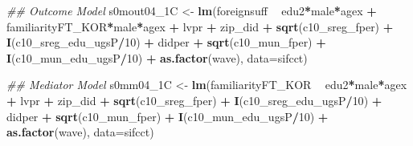 \documentclass[
]{article}
\newenvironment{Shaded}{\begin{snugshade}}{\end{snugshade}}
\newcommand{\CommentTok}[1]{\textcolor[rgb]{0.56,0.35,0.01}{\textit{#1}}}
\newcommand{\DataTypeTok}[1]{\textcolor[rgb]{0.13,0.29,0.53}{#1}}
\newcommand{\DecValTok}[1]{\textcolor[rgb]{0.00,0.00,0.81}{#1}}
\newcommand{\KeywordTok}[1]{\textcolor[rgb]{0.13,0.29,0.53}{\textbf{#1}}}
\newcommand{\NormalTok}[1]{#1}
\newcommand{\OperatorTok}[1]{\textcolor[rgb]{0.81,0.36,0.00}{\textbf{#1}}}
\newcommand{\StringTok}[1]{\textcolor[rgb]{0.31,0.60,0.02}{#1}}
\begin{document}
\begin{Shaded}
\begin{Highlighting}[]
\CommentTok{## Outcome Model }
\NormalTok{s0mout04_1C <-}\StringTok{ }\KeywordTok{lm}\NormalTok{(foreignsuff  }\OperatorTok{~}\StringTok{ }\NormalTok{edu2}\OperatorTok{*}\NormalTok{male}\OperatorTok{*}\NormalTok{agex }\OperatorTok{+}\StringTok{ }\NormalTok{familiarityFT_KOR}\OperatorTok{*}\NormalTok{male}\OperatorTok{*}\NormalTok{agex }\OperatorTok{+}\StringTok{ }\NormalTok{lvpr }\OperatorTok{+}\StringTok{  }
\StringTok{                    }\NormalTok{zip_did }\OperatorTok{+}\StringTok{ }\KeywordTok{sqrt}\NormalTok{(c10_sreg_fper) }\OperatorTok{+}\StringTok{ }\KeywordTok{I}\NormalTok{(c10_sreg_edu_ugsP}\OperatorTok{/}\DecValTok{10}\NormalTok{) }\OperatorTok{+}\StringTok{ }
\StringTok{                    }\NormalTok{didper }\OperatorTok{+}\StringTok{ }\KeywordTok{sqrt}\NormalTok{(c10_mun_fper) }\OperatorTok{+}\StringTok{ }\KeywordTok{I}\NormalTok{(c10_mun_edu_ugsP}\OperatorTok{/}\DecValTok{10}\NormalTok{) }\OperatorTok{+}\StringTok{ }
\StringTok{                    }\KeywordTok{as.factor}\NormalTok{(wave), }\DataTypeTok{data=}\NormalTok{sifcct)}

\CommentTok{## Mediator Model}
\NormalTok{s0mm04_1C <-}\StringTok{ }\KeywordTok{lm}\NormalTok{(familiarityFT_KOR  }\OperatorTok{~}\StringTok{ }\NormalTok{edu2}\OperatorTok{*}\NormalTok{male}\OperatorTok{*}\NormalTok{agex }\OperatorTok{+}\StringTok{ }\NormalTok{lvpr }\OperatorTok{+}\StringTok{  }
\StringTok{                  }\NormalTok{zip_did }\OperatorTok{+}\StringTok{ }\KeywordTok{sqrt}\NormalTok{(c10_sreg_fper) }\OperatorTok{+}\StringTok{ }\KeywordTok{I}\NormalTok{(c10_sreg_edu_ugsP}\OperatorTok{/}\DecValTok{10}\NormalTok{) }\OperatorTok{+}\StringTok{ }
\StringTok{                  }\NormalTok{didper }\OperatorTok{+}\StringTok{ }\KeywordTok{sqrt}\NormalTok{(c10_mun_fper) }\OperatorTok{+}\StringTok{ }\KeywordTok{I}\NormalTok{(c10_mun_edu_ugsP}\OperatorTok{/}\DecValTok{10}\NormalTok{) }\OperatorTok{+}\StringTok{ }
\StringTok{                  }\KeywordTok{as.factor}\NormalTok{(wave), }\DataTypeTok{data=}\NormalTok{sifcct)}


\end{Highlighting}
\end{Shaded}
\end{document}
